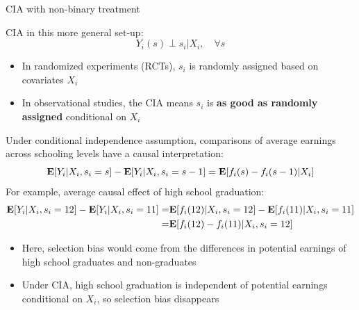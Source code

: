 \documentclass[compress, 8pt]{beamer}
\begin{document}
\begin{frame}{CIA with non-binary treatment}

CIA in this more general set-up:
\begin{equation*}
    Y_{i} (s) \perp s_i \vert X_i, \quad \forall s
\end{equation*}
\begin{itemize}
    \item In randomized experiments (RCTs), $s_i$ is randomly assigned based on covariates $X_i$
    \item In observational studies, the CIA means $s_i$ is \textbf{as good as randomly assigned} conditional on $X_i$
\end{itemize}
Under conditional independence assumption, comparisons of average earnings across schooling levels have a causal interpretation:
\begin{equation*}
    \mathbf{E} [Y_i \vert X_i, s_i = s] - \mathbf{E}[Y_i \vert X_i, s_i = s - 1] = \mathbf{E} [f_i(s) - f_i(s - 1) \vert X_i]
\end{equation*}
For example, average causal effect of high school graduation:
\begin{align*}
    \mathbf{E} [Y_i \vert X_i, s_i = 12] - \mathbf{E}[Y_i \vert X_i, s_i = 11] =& \mathbf{E} [f_i (12) \vert X_i, s_i = 12] - \mathbf{E} [f_i (11) \vert X_i, s_i = 11] \\
    =& \mathbf{E} [f_i(12) - f_i(11) \vert X_i, s_i = 12] 
\end{align*}
\begin{itemize}
    \item Here, selection bias would come from the differences in potential earnings of high school graduates and non-graduates
    \item Under CIA, high school graduation is independent of potential earnings conditional on $X_i$, so selection bias disappears
\end{itemize}

\end{frame}
\end{document}
